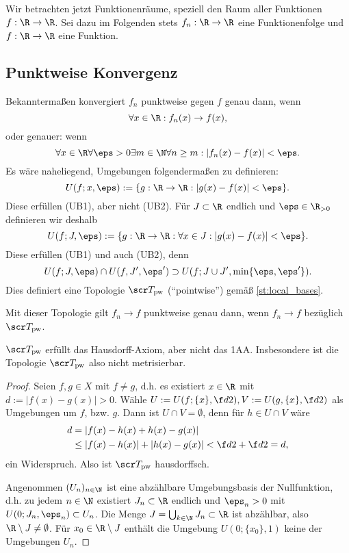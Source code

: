 Wir betrachten jetzt Funktionenräume, speziell den Raum aller Funktionen $f: \R \to \R$.
Sei dazu im Folgenden stets $f_n: \R \to \R$ eine Funktionenfolge und $f: \R \to \R$ eine Funktion.

\subsection{Punktweise Konvergenz}

Bekanntermaßen konvergiert $f_n$ punktweise gegen $f$ genau dann, wenn
\[
	\forall x \in \R : f_n(x) \to f(x),
\]
oder genauer: wenn
\[
	\forall x \in \R \forall \eps > 0 \exists m \in \N \forall n \ge m : |f_n(x) - f(x)| < \eps.
\]
Es wäre naheliegend, Umgebungen folgendermaßen zu definieren:
\[
	U(f; x, \eps)
	:= \{ g: \R \to \R : |g(x) - f(x)| < \eps \}.
\]
Diese erfüllen (UB1), aber nicht (UB2).
Für $J \subset \R$ endlich und $\eps \in \R_{>0}$ definieren wir deshalb
\[
	U(f; J, \eps)
	:= \{ g: \R \to \R : \forall x \in J : |g(x) - f(x)| < \eps \}.
\]
Diese erfüllen (UB1) und auch (UB2), denn
\[
	U(f; J, \eps) \cap U(f, J', \eps')
	\supset U(f; J \cup J', \min\{\eps, \eps'\}).
\]
Dies definiert eine Topologie $\scr T_{\text{pw}}$ (“pointwise”) gemäß \ref{st:local_bases}.

Mit dieser Topologie gilt $f_n \to f$ punktweise genau dann, wenn $f_n \to f$ bezüglich $\scr T_{\text{pw}}$.

\begin{st}
	$\scr T_{\text{pw}}$ erfüllt das Hausdorff-Axiom, aber nicht das 1AA.
	Insbesondere ist die Topologie $\scr T_{\text{pw}}$ also nicht metrisierbar.
	\begin{proof}
		Seien $f,g \in X$ mit $f \neq g$, d.h. es existiert $x \in \R$ mit $d := |f(x) - g(x)| > 0$.
		Wähle $U := U(f; \{x\}, \f d2), V := U(g, \{x\}, \f d2)$ als Umgebungen um $f$, bzw. $g$.
		Dann ist $U \cap V = \emptyset$, denn für $h \in U \cap V$ wäre
		\begin{align*}
			d
			&= |f(x) - h(x) + h(x) - g(x)| \\
			&\le |f(x) - h(x)| + |h(x) - g(x)|
			< \f d2 + \f d2
			= d,
		\end{align*}
		ein Widerspruch.
		Also ist $\scr T_{\text{pw}}$ hausdorffsch.

		Angenommen $(U_n)_{n\in\N}$ ist eine abzählbare Umgebungsbasis der Nullfunktion,
		d.h. zu jedem $n \in \N$ existiert $J_n \subset \R$ endlich und $\eps_n > 0$ mit $U(0; J_n, \eps_n) \subset U_n$.
		Die Menge $J = \bigcup_{k\in\N} J_n \subset \R$ ist abzählbar, also $\R \setminus J \neq \emptyset$.
		Für $x_0 \in \R \setminus J$ enthält die Umgebung $U(0; \{x_0\}, 1)$ keine der Umgebungen $U_n$.
	\end{proof}
\end{st}

